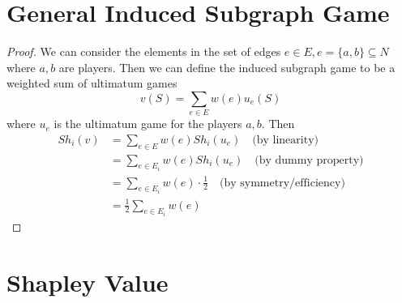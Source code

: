

\usepackage{empheq}




\section{General Induced Subgraph Game}
\begin{proof}
    We can consider the elements in the set of edges 
    $e\in E,e=\{a,b\} \subseteq N$ where $a,b$ are players.
    Then we can define the induced subgraph game to be
    a weighted sum of ultimatum games
    \[v(S)=\sum_{e\in E} w(e)u_e(S)\]
    where $u_e$ is the ultimatum game for the players $a,b$. 
    Then
    \begin{equation}
    \begin{aligned}
        Sh_i(v)&=\sum_{e\in E} w(e)Sh_i(u_e) \quad\text{(by linearity)}\\
        &= \sum_{e\in E_i} w(e)Sh_i(u_e) \quad\text{(by dummy property)}\\
        &= \sum_{e\in E_i} w(e)\cdot\frac{1}{2} 
        \quad\text{(by symmetry/efficiency)}\\
        &= \frac{1}{2} \sum_{e\in E_i} w(e)
    \end{aligned}
    \end{equation}
\end{proof}


\newpage
\section{Shapley Value}
